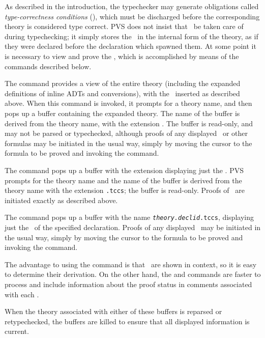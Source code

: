 As described in the introduction, the typechecker may generate
obligations called \emph{type-correctness conditions} (\tccs), which
must be discharged before the corresponding theory is considered type
correct.  PVS does not insist that \tccs\ be taken care of during
typechecking; it simply stores the \tccs\ in the internal form of the
theory, as if they were declared before the declaration which spawned
them.  At some point it is necessary to view and prove the \tccs, which
is accomplished by means of the commands described below.


The  command provides a view of the entire
theory (including the expanded definitions of inline ADTs and
conversions), with the \tccs\ inserted as described above.  When this command
is invoked, it prompts for a theory name, and then pops up a buffer
containing the expanded theory.  The name of the buffer is derived from
the theory name, with the extension .  The buffer is
read-only, and may not be parsed or typechecked, although proofs of any
displayed \tccs\ or other formulas may be initiated in the usual way,
simply by moving the cursor to the formula to be proved and invoking the
 command.

The  command pops up a buffer with the extension
 displaying just the \tccs.  PVS prompts for the theory name
and the name of the buffer is derived from the theory name with the
extension \texttt{.tccs}; the buffer is read-only.  Proofs of \tccs\ are
initiated exactly as described above.

The  command pops up a buffer with the name
\texttt{\emph{theory.decl\-id}.tccs}, displaying just the \tccs\ of the
specified declaration.  Proofs of any displayed \tccs\ may be initiated in
the usual way, simply by moving the cursor to the formula to be proved and
invoking the  command.

The advantage to using the  command is that
\tccs\ are shown in context, so it is easy to determine their derivation.
On the other hand, the  and 
commands are faster to process and include information about the proof
status in comments associated with each \tcc.

When the theory associated with either of these buffers is reparsed or
retypechecked, the buffers are killed to ensure that all displayed
information is current.

